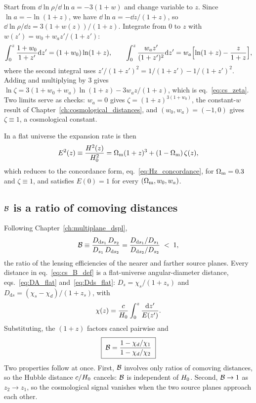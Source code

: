 \begin{derivation}
Start from $\dd\ln\rho/\dd\ln a=-3(1+w)$ and change variable to $z$.
Since $\ln a=-\ln(1+z)$, we have $\dd\ln a=-\dd z/(1+z)$, so
$\dd\ln\rho/\dd z=3(1+w(z))/(1+z)$. Integrate from $0$ to $z$ with
$w(z')=w_0+w_a z'/(1+z')$:
\[
  \int_0^z\frac{1+w_0}{1+z'}\dd z'=(1+w_0)\ln(1+z),\qquad
  \int_0^z\frac{w_a z'}{(1+z')^2}\dd z'
  =w_a\Bigl[\ln(1+z)-\frac{z}{1+z}\Bigr],
\]
where the second integral uses $z'/(1+z')^2=1/(1+z')-1/(1+z')^2$.
Adding and multiplying by $3$ gives
$\ln\zeta=3(1+w_0+w_a)\ln(1+z)-3w_az/(1+z)$, which is
eq.~\eqref{eq:cs_zeta}. Two limits serve as checks:
$w_a=0$ gives $\zeta=(1+z)^{3(1+w_0)}$, the constant-$w$ result of
Chapter~\ref{ch:cosmological_distances}, and $(w_0,w_a)=(-1,0)$ gives
$\zeta\equiv1$, a cosmological constant.
\end{derivation}

In a flat universe the expansion rate is then
\begin{equation}
  E^2(z)\equiv\frac{H^2(z)}{H_0^2}=\Omega_{\mathrm{m}}(1+z)^3+(1-\Omega_{\mathrm{m}})\,\zeta(z),
  \label{eq:cs_E}
\end{equation}
which reduces to the concordance form, eq.~\eqref{eq:Hz_concordance}, for
$\Omega_{\mathrm{m}}=0.3$ and $\zeta\equiv1$, and satisfies $E(0)=1$ for every
$(\Omega_{\mathrm{m}},w_0,w_a)$.

\subsection{$\mathcal{B}$ is a ratio of comoving distances}

Following Chapter~\ref{ch:multiplane_dspl},
\begin{equation}
  \mathcal{B}\equiv\frac{D_{\mathrm{d}s_1}\,D_{s_2}}{D_{s_1}\,D_{\mathrm{d}s_2}}
  =\frac{D_{\mathrm{d}s_1}/D_{s_1}}{D_{\mathrm{d}s_2}/D_{s_2}}\;<\;1 ,
  \label{eq:cs_B_def}
\end{equation}
the ratio of the lensing efficiencies of the nearer and farther source
planes. Every distance in eq.~\eqref{eq:cs_B_def} is a flat-universe
angular-diameter distance, eqs.~\eqref{eq:DA_flat} and~\eqref{eq:Dds_flat}:
$D_{s}=\chi_s/(1+z_s)$ and $D_{\mathrm{d}s}=(\chi_s-\chi_d)/(1+z_s)$, with
\begin{equation}
  \chi(z)=\frac{c}{H_0}\int_0^z\frac{\dd z'}{E(z')} .
  \label{eq:cs_chi}
\end{equation}
Substituting, the $(1+z)$ factors cancel pairwise and
\begin{equation}
  \boxed{\;\mathcal{B}=\frac{1-\chi_d/\chi_1}{1-\chi_d/\chi_2}\;}
  \label{eq:cs_B_chi}
\end{equation}
Two properties follow at once. First, $\mathcal{B}$ involves only
ratios of comoving distances, so the Hubble distance
$c/H_0$ cancels: $\mathcal{B}$ is independent of $H_0$.
Second, $\mathcal{B}\to1$ as $z_2\to z_1$, so the cosmological signal vanishes
when the two source planes approach each other.


